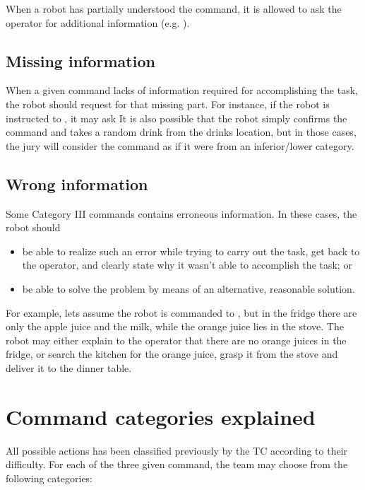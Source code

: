 When a robot has partially understood the command, it is allowed to ask the operator for additional information (e.g. \textit{}).

\subsection{Missing information}
When a given command lacks of information required for accomplishing the task, the robot should request for that missing part. For instance, if the robot is instructed to \textit{}, it may ask \textit{} It is also possible that the robot simply confirms the command and takes a random drink from the drinks location, but in those cases, the jury will consider the command as if it were from an inferior/lower category.

\subsection{Wrong information}
Some Category III commands contains erroneous information. In these cases, the robot should
\begin{itemize}
	\item be able to realize such an error while trying to carry out the task, get back to the operator, and clearly state why it wasn't able to accomplish the task; or
	\item be able to solve the problem by means of an alternative, reasonable solution.
\end{itemize}

For example, lets assume the robot is commanded to \textit{}, but in the fridge there are only the apple juice and the milk, while the orange juice lies in the stove. The robot may either explain to the operator that there are no orange juices in the fridge, or search the kitchen for the orange juice, grasp it from the stove and deliver it to the dinner table.

\section{Command categories explained}
All possible actions has been classified previously by the TC according to their difficulty. For each of the three given command, the team may choose from the following categories:


